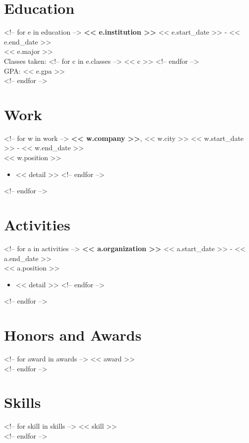 \documentclass[margin]{res}
\begin{document}
 
 
 
\address{<< address.street >> \\ << address.city >> << address.zip >> \\ << email >> \\ << website >> \\ << phone >>}

 
\begin{resume} 

\section{Education}
<!-- for e in education -->
  {\bf << e.institution >>} \hfill << e.start_date >> - << e.end_date >> \\
  << e.major >> \\
  Classes taken: <!-- for c in e.classes --> << c >> <!-- endfor --> \\
  GPA: << e.gpa >> \\
<!-- endfor -->
 

\section{Work}
<!-- for w in work -->
  {\bf << w.company >>}, << w.city >> \hfill << w.start_date >> - << w.end_date >> \\ << w.position >>

  \begin{itemize} \itemsep -2pt  %
  <!-- for detail in w.details -->
    \item << detail >>
  <!-- endfor -->
  \end{itemize}
<!-- endfor -->
 

\section{Activities} 

<!-- for a in activities -->
  {\bf << a.organization >>} \hfill << a.start_date >> - << a.end_date >> \\ << a.position >>

  \begin{itemize} \itemsep -2pt
    <!-- for detail in a.details -->
      \item << detail >>
    <!-- endfor -->
  \end{itemize}
<!-- endfor -->


\section{Honors and Awards}
<!-- for award in awards --> << award >> \\
<!-- endfor -->


\section{Skills}
<!-- for skill in skills --> << skill >> \\
<!-- endfor -->


\end{resume} 
\end{document}
